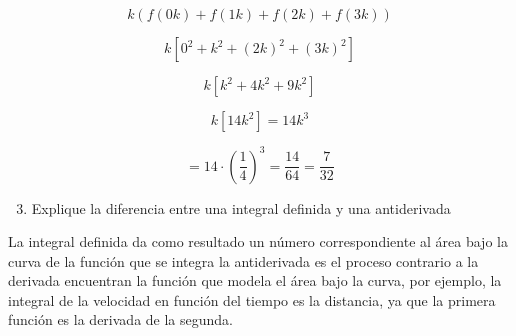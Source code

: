 \[
k (f(0k) + f(1k) + f(2k) + f(3k))
\]

\[
k [0^2 + k^2 + (2k)^2 + (3k)^2]
\]

\[
k [k^2 + 4k^2 + 9k^2]
\]

\[
k [14k^2] = 14k^3
\]

\[
= 14 \cdot \left(\frac{1}{4}\right)^3 = \frac{14}{64} = \frac{7}{32}
\]

\begin{enumerate}
    \setcounter{enumi}{2}
    \item Explique la diferencia entre una integral definida y una antiderivada
\end{enumerate}

La integral definida da como resultado un número correspondiente al área bajo la curva de la
función que se integra la antiderivada es el proceso contrario a la derivada
encuentran la función que modela el área bajo la curva, por ejemplo, la integral de la
velocidad en función del tiempo es la distancia, ya que la primera función es la derivada de la segunda.